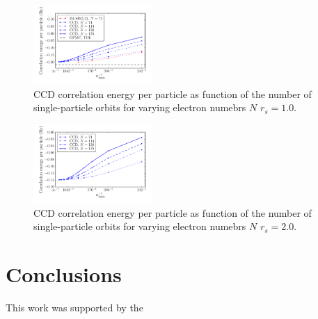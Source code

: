 \documentclass[aps,twocolumn,showpacs,floatfix,nofootinbib,preprintnumbers,superscriptaddress,amsmath,amssymb]{revtex4-1}
\begin{document}
\begin{figure}[hbtp]
     \begin{center}

            \includegraphics[width=0.4\textwidth]{figures/nOrbitsEneNRs10.pdf}
    \end{center}
    \caption{CCD correlation energy per particle as function of the number of
single-particle orbits for varying  electron numebrs $N$ $r_s=1.0$.}
            \label{fig:ccd05}
\end{figure}

\begin{figure}[hbtp]
     \begin{center}

            \includegraphics[width=0.4\textwidth]{figures/nOrbitsEneNRs20.pdf}
    \end{center}
    \caption{CCD correlation energy per particle as function of the number of
single-particle orbits for varying  electron numebrs $N$ $r_s=2.0$.}
            \label{fig:ccd05}
\end{figure}



\section{Conclusions}
\label{sec:conclusions}
%
\begin{acknowledgments}
  This work was supported by the 

\end{acknowledgments}


 
\end{document}
